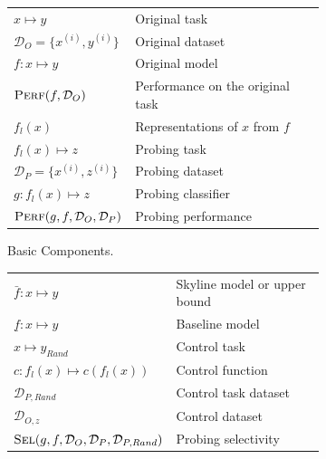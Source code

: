\documentclass[discussion]{clv3}
\begin{document}
\begin{figure}[h]
    \centering
    \begin{subfigure}[b]{\textwidth}
    \centering
        \begin{tabular}{l @{\hskip 1em} l } 
        \toprule
         $x \mapsto y$ & Original task \\
         $\mathcal{D}_O = \{x^{(i)}, y^{(i)}\} $ & Original dataset \\
         $f : x \mapsto y $ & Original model \\
         $\textsc{Perf}(f, \mathcal{D}_O)$ & Performance on the original task \\
         $f_l(x)$ & Representations of $x$ from $f$\\
         $f_l(x) \mapsto z$ & Probing task \\
         $\mathcal{D}_P = \{x^{(i)}, z^{(i)}\} $ & Probing dataset \\
         $g : f_l(x) \mapsto z$ & Probing classifier \\
         $\textsc{Perf}(g, f, \mathcal{D}_O, \mathcal{D}_P) $ & Probing performance  \\ 
         \bottomrule
        \end{tabular}
         \caption{Basic Components.}
         \label{fig:probing-components-basic}
     \end{subfigure}
     \begin{subfigure}[b]{\textwidth}
     \centering
        \begin{tabular}{l @{\hskip 1em} l } 
        \toprule          
         $\bar{f} : x \mapsto y$ & Skyline model or upper bound \\ 
         $\underline{f} : x \mapsto y$ & Baseline model \\          
         $x \mapsto y_{Rand}$ & Control task \cite{hewitt-liang-2019-designing} \\ 
         $c : f_l(x) \mapsto c(f_l(x)) $ & Control function \cite{pimentel-etal-2020-information} \\ 
         $\mathcal{D}_{P,Rand}$ & Control task dataset \cite{hewitt-liang-2019-designing} \\ 
         $\mathcal{D}_{O,z}$ & Control dataset \cite{ravichander:2021:eacl} \\          
         $\textsc{Sel}(g, f, \mathcal{D}_O, \mathcal{D}_P, \mathcal{D}_{P,Rand})$ & Probing selectivity \cite{hewitt-liang-2019-designing} \\

\end{tabular}
\end{subfigure}
\end{figure}
\end{document}
